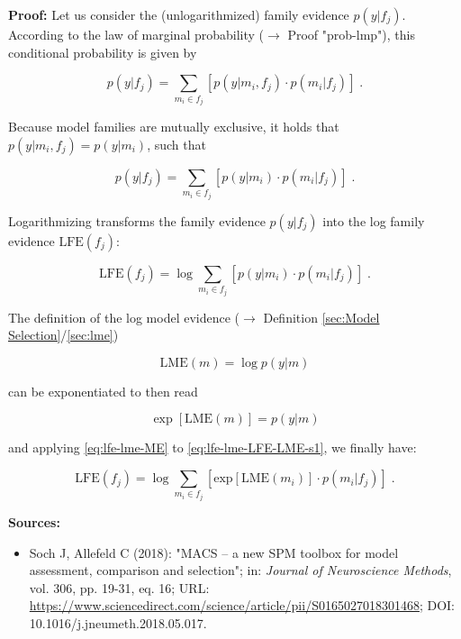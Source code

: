 \documentclass[a4paper,12pt]{book}
\begin{document}
\vspace{1em}
\textbf{Proof:} Let us consider the (unlogarithmized) family evidence $p(y \vert f_j)$. According to the law of marginal probability ($\rightarrow$ Proof "prob-lmp"), this conditional probability is given by

\begin{equation} \label{eq:lfe-lme-FE-ME-s1}
p(y|f_j) = \sum_{m_i \in f_j} \left[ p(y|m_i,f_j) \cdot p(m_i|f_j) \right] \; .
\end{equation}

Because model families are mutually exclusive, it holds that $p(y \vert m_i,f_j) = p(y \vert m_i)$, such that

\begin{equation} \label{eq:lfe-lme-FE-ME-s2}
p(y|f_j) = \sum_{m_i \in f_j} \left[ p(y|m_i) \cdot p(m_i|f_j) \right] \; .
\end{equation}

Logarithmizing transforms the family evidence $p(y \vert f_j)$ into the log family evidence $\mathrm{LFE}(f_j)$:

\begin{equation} \label{eq:lfe-lme-LFE-LME-s1}
\mathrm{LFE}(f_j) = \log \sum_{m_i \in f_j} \left[ p(y|m_i) \cdot p(m_i|f_j) \right] \; .
\end{equation}

The definition of the log model evidence ($\rightarrow$ Definition \ref{sec:Model Selection}/\ref{sec:lme})

\begin{equation} \label{eq:lfe-lme-LME}
\mathrm{LME}(m) = \log p(y|m)
\end{equation}

can be exponentiated to then read

\begin{equation} \label{eq:lfe-lme-ME}
\exp\left[ \mathrm{LME}(m) \right] = p(y|m)
\end{equation}

and applying \eqref{eq:lfe-lme-ME} to \eqref{eq:lfe-lme-LFE-LME-s1}, we finally have:

\begin{equation} \label{eq:lfe-lme-LFE-LME-s2}
\mathrm{LFE}(f_j) = \log \sum_{m_i \in f_j} \left[ \mathrm{exp}[\mathrm{LME}(m_i)] \cdot p(m_i|f_j) \right] \; .
\end{equation}

\vspace{1em}
\textbf{Sources:}
\begin{itemize}
\item Soch J, Allefeld C (2018): "MACS – a new SPM toolbox for model assessment, comparison and selection"; in: \textit{Journal of Neuroscience Methods}, vol. 306, pp. 19-31, eq. 16; URL: \url{https://www.sciencedirect.com/science/article/pii/S0165027018301468}; DOI: 10.1016/j.jneumeth.2018.05.017.
\end{itemize}
\end{document}
